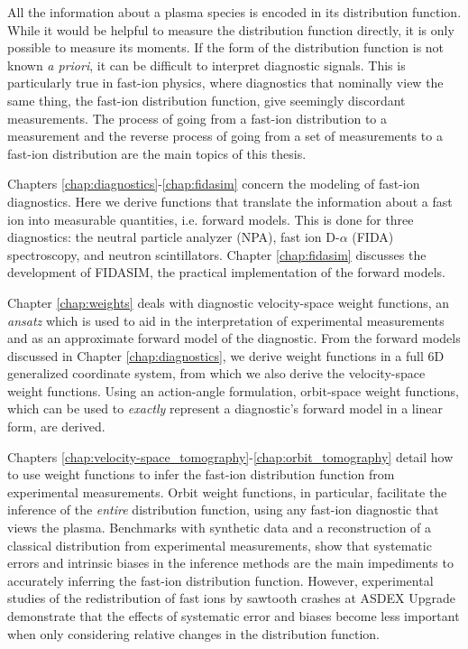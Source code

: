 \thesisabstract
{
All the information about a plasma species is encoded in its distribution function. While it would be helpful to measure the distribution function directly, it is only possible to measure its moments. If the form of the distribution function is not known \textit{a priori}, it can be difficult to interpret diagnostic signals. This is particularly true in fast-ion physics, where diagnostics that nominally view the same thing, the fast-ion distribution function, give seemingly discordant measurements. The process of going from a fast-ion distribution to a measurement and the reverse process of going from a set of measurements to a fast-ion distribution are the main topics of this thesis.

Chapters \ref{chap:diagnostics}-\ref{chap:fidasim} concern the modeling of fast-ion diagnostics. Here we derive functions that translate the information about a fast ion into measurable quantities, i.e. forward models. This is done for three diagnostics: the neutral particle analyzer (NPA), fast ion D-$\alpha$ (FIDA) spectroscopy, and neutron scintillators. Chapter \ref{chap:fidasim} discusses the development of FIDASIM\cite{heidbrink2011code,geiger2013thesis,FIDASIM}, the practical implementation of the forward models.

Chapter \ref{chap:weights} deals with diagnostic velocity-space weight functions, an \textit{ansatz} which is used to aid in the interpretation of experimental measurements and as an approximate forward model of the diagnostic. From the forward models discussed in Chapter \ref{chap:diagnostics}, we derive weight functions in a full 6D generalized coordinate system, from which we also derive the velocity-space weight functions. Using an action-angle formulation, orbit-space weight functions, which can be used to \textit{exactly} represent a diagnostic's forward model in a linear form, are derived.

Chapters \ref{chap:velocity-space_tomography}-\ref{chap:orbit_tomography} detail how to use weight functions to infer the fast-ion distribution function from experimental measurements. Orbit weight functions, in particular, facilitate the inference of the \textit{entire} distribution function, using any fast-ion diagnostic that views the plasma. Benchmarks with synthetic data and a reconstruction of a classical distribution from experimental measurements, show that systematic errors and intrinsic biases in the inference methods are the main impediments to accurately inferring the fast-ion distribution function. However, experimental studies of the redistribution of fast ions by sawtooth crashes at ASDEX Upgrade demonstrate that the effects of systematic error and biases become less important when only considering relative changes in the distribution function. 
}



